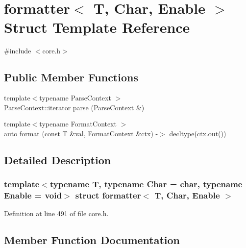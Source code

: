 \hypertarget{structformatter}{}\section{formatter$<$ T, Char, Enable $>$ Struct Template Reference}
\label{structformatter}


{\ttfamily \#include $<$core.\+h$>$}

\subsection*{Public Member Functions}
\begin{DoxyCompactItemize}
\item 
{\footnotesize template$<$typename Parse\+Context $>$ }\\Parse\+Context\+::iterator \hyperlink{structformatter_ab38951e604996ba856509a99ddb5c50a}{parse} (Parse\+Context \&)
\item 
{\footnotesize template$<$typename Format\+Context $>$ }\\auto \hyperlink{structformatter_aca465bfbf4f85abe5bd958dc45430346}{format} (const T \&val, Format\+Context \&ctx) -\/$>$ decltype(ctx.\+out())
\end{DoxyCompactItemize}


\subsection{Detailed Description}
\subsubsection*{template$<$typename T, typename Char = char, typename Enable = void$>$\newline
struct formatter$<$ T, Char, Enable $>$}



Definition at line 491 of file core.\+h.



\subsection{Member Function Documentation}
\mbox{\label{structformatter_aca465bfbf4f85abe5bd958dc45430346}} 
